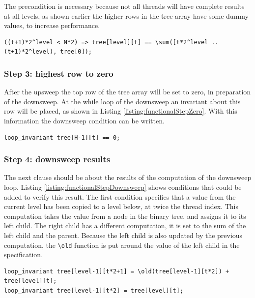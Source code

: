 \documentclass[a4paper]{article}
\newcommand{\code}[1]{\texttt{\small \color{inline}#1}} %
\begin{document}
The precondition is necessary because not all threads will have complete results at all levels, as shown earlier the higher rows in the tree array have some dummy values, to increase performance.

\begin{lstlisting}[caption=Upsweep loop\_invariant enforcing sum of inputs, label=listing:functionalStepUpsweepSum, float=htpb]
((t+1)*2^level < N*2) => tree[level][t] == \sum([t*2^level ..(t+1)*2^level), tree[0]);
\end{lstlisting}

\subsubsection{Step 3: highest row to zero}
After the upsweep the top row of the tree array will be set to zero, in preparation of the downsweep. At the while loop of the downsweep an invariant about this row will be placed, as shown in Listing \ref{listing:functionalStepZero}. With this information the downsweep condition can be written.

\begin{lstlisting}[caption=Top row of the tree array to zero, label=listing:functionalStepZero, float=htpb]
loop_invariant tree[H-1][t] == 0;
\end{lstlisting}

\subsubsection{Step 4: downsweep results} 
The next clause should be about the results of the computation of the downsweep loop. Listing \ref{listing:functionalStepDownsweep} shows conditions that could be added to verify this result. The first condition specifies that a value from the current level has been copied to a level below, at twice the thread index. This computation takes the value from a node in the binary tree, and assigns it to its left child. The right child has a different computation, it is set to the sum of the left child and the parent. Because the left child is also updated by the previous computation, the \code{\textbackslash old} function is put around the value of the left child in the specification.

\begin{lstlisting}[caption=Downsweep results loop\_invariant, label=listing:functionalStepDownsweep, float=htpb]
loop_invariant tree[level-1][t*2+1] = \old(tree[level-1][t*2]) + tree[level][t];
loop_invariant tree[level-1][t*2] = tree[level][t];
\end{lstlisting}
\end{document}
